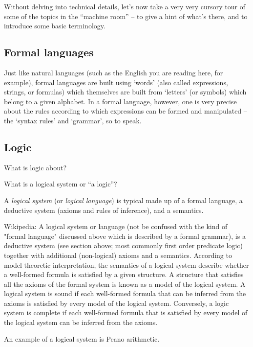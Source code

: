 Without delving into technical details, let's now take a very very cursory tour of some of the topics in the ``machine room'' -- to give a hint of what's there, and to introduce some basic terminology.

\subsection{Formal languages}

Just like natural languages (such as the English you are reading here, for example), formal languages are built using `words' (also called expressions, strings, or formulas) which themselves are built from `letters' (or symbols) which belong to a given alphabet.
In a formal language, however, one is very precise about the rules according to which expressions can be formed and manipulated -- the `syntax rules' and `grammar', so to speak.


\subsection{Logic}
What is logic about?

What is a logical system or ``a logic''?

A \emph{logical system} (or \emph{logical language}) is typical made up of a formal language, a deductive system (axioms and rules of inference), and a semantics.

Wikipedia: A logical system or language (not be confused with the kind of "formal language" discussed above which is described by a formal grammar), is a deductive system (see section above; most commonly first order predicate logic) together with additional (non-logical) axioms and a semantics.
According to model-theoretic interpretation, the semantics of a logical system describe whether a well-formed formula is satisfied by a given structure.
A structure that satisfies all the axioms of the formal system is known as a model of the logical system.
A logical system is sound if each well-formed formula that can be inferred from the axioms is satisfied by every model of the logical system.
Conversely, a logic system is complete if each well-formed formula that is satisfied by every model of the logical system can be inferred from the axioms.

An example of a logical system is Peano arithmetic.

